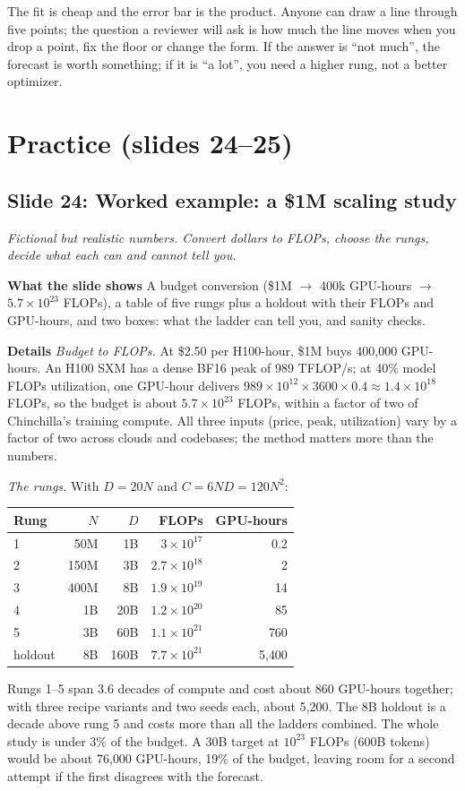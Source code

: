 \documentclass[11pt,letterpaper]{article}
\newcommand{\setstage}[1]{\colorlet{stagec}{#1}}
\newcommand{\slide}[3]{%
  \subsection[Slide #1: #2]{Slide #1: #2}%
  {\color{muted}\itshape #3\par}\medskip}
\newcommand{\para}[1]{\medskip\noindent\textbf{#1}\quad}
\newenvironment{intuition}{\begin{tcolorbox}[intuitionbox]}{\end{tcolorbox}}
\begin{document}
\begin{intuition}
The fit is cheap and the error bar is the product. Anyone can draw a line through five points; the question a reviewer will ask is how much the line moves when you drop a point, fix the floor or change the form. If the answer is ``not much'', the forecast is worth something; if it is ``a lot'', you need a higher rung, not a better optimizer.
\end{intuition}

\setstage{trn}
\section{Practice (slides 24--25)}

\slide{24}{Worked example: a \$1M scaling study}{Fictional but realistic numbers. Convert dollars to FLOPs, choose the rungs, decide what each can and cannot tell you.}

\para{What the slide shows} A budget conversion (\$1M $\to$ 400k GPU-hours $\to$ $5.7\times10^{23}$ FLOPs), a table of five rungs plus a holdout with their FLOPs and GPU-hours, and two boxes: what the ladder can tell you, and sanity checks.

\para{Details} \emph{Budget to FLOPs.} At \$2.50 per H100-hour, \$1M buys 400{,}000 GPU-hours. An H100 SXM has a dense BF16 peak of 989 TFLOP/s; at 40\% model FLOPs utilization, one GPU-hour delivers $989\times10^{12}\times3600\times0.4\approx1.4\times10^{18}$ FLOPs, so the budget is about $5.7\times10^{23}$ FLOPs, within a factor of two of Chinchilla's training compute. All three inputs (price, peak, utilization) vary by a factor of two across clouds and codebases; the method matters more than the numbers.

\emph{The rungs.} With $D=20N$ and $C=6ND=120N^2$:
\begin{center}
\small
\begin{tabular}{@{}lrrrr@{}}
\toprule
Rung & $N$ & $D$ & FLOPs & GPU-hours \\
\midrule
1 & 50M & 1B & $3\times10^{17}$ & 0.2 \\
2 & 150M & 3B & $2.7\times10^{18}$ & 2 \\
3 & 400M & 8B & $1.9\times10^{19}$ & 14 \\
4 & 1B & 20B & $1.2\times10^{20}$ & 85 \\
5 & 3B & 60B & $1.1\times10^{21}$ & 760 \\
holdout & 8B & 160B & $7.7\times10^{21}$ & 5{,}400 \\
\bottomrule
\end{tabular}
\end{center}
Rungs 1--5 span 3.6 decades of compute and cost about 860 GPU-hours together; with three recipe variants and two seeds each, about 5{,}200. The 8B holdout is a decade above rung 5 and costs more than all the ladders combined. The whole study is under 3\% of the budget. A 30B target at $10^{23}$ FLOPs (600B tokens) would be about 76{,}000 GPU-hours, 19\% of the budget, leaving room for a second attempt if the first disagrees with the forecast.
\end{document}
